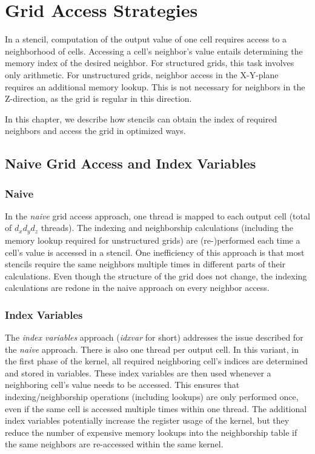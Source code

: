 \chapter{Grid Access Strategies} \label{sec:optimizations}

In a stencil, computation of the output value of one cell requires access to a neighborhood of cells. Accessing a cell's neighbor's value entails determining the memory index of the desired neighbor. For structured grids, this task involves only arithmetic. For unstructured grids, neighbor access in the X-Y-plane requires an additional memory lookup. This is not necessary for neighbors in the Z-direction, as the grid is regular in this direction.

In this chapter, we describe how stencils can obtain the index of required neighbors and access the grid in optimized ways.

\section{Naive Grid Access and Index Variables}

\subsection{Naive} In the \emph{naive} grid access approach, one thread is mapped to each output cell (total of $d_xd_yd_z$ threads). The indexing and neighborship calculations (including the memory lookup required for unstructured grids) are (re-)performed each time a cell's value is accessed in a stencil.  One inefficiency of this approach is that most stencils require the same neighbors multiple times in different parts of their calculations. Even though the structure of the grid does not change, the indexing calculations are redone in the naive approach on every neighbor access.

\subsection{Index Variables} The \emph{index variables} approach (\emph{idxvar} for short) addresses the issue described for the \emph{naive} approach. There is also one thread per output cell. In this variant, in the first phase of the kernel, all required neighboring cell's indices are determined and stored in variables. These index variables are then used whenever a neighboring cell's value needs to be accessed. This ensures that indexing/neighborship operations (including lookups) are only performed once, even if the same cell is accessed multiple times within one thread. The additional index variables potentially increase the register usage of the kernel, but they reduce the number of expensive memory lookups into the neighborship table if the same neighbors are re-accessed within the same kernel.

